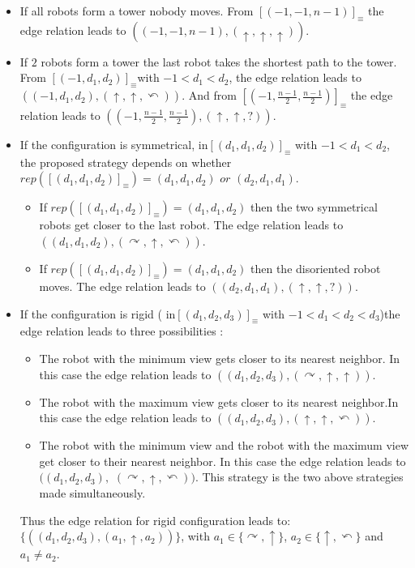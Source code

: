 \documentclass[envcountsame]{llncs} \usepackage[english]{babel}
\newcommand{\equivclass}[1]{[#1]_\equiv}
\newcommand{\rep}{\ensuremath{\mathit{rep}}}
\newcommand{\clockwise}{\ensuremath{\curvearrowright}}
\newcommand{\counterclockwise}{\ensuremath{\curvearrowleft}}
\newcommand{\still}{\ensuremath{\uparrow}}
\newcommand{\disoriented}{?}
\begin{document}
\begin{itemize}[parsep=0cm,itemsep=0cm,topsep=0cm] 
	\item If all robots form a tower nobody moves.
From $\equivclass{(-1, -1, n-1)}$ the edge relation leads to $((-1, -1, n-1),(\still, \still, \still))$.
	\item If $2$ robots form a tower the last robot takes the shortest path to the tower.
From $\equivclass{(-1, d_1, d_2)}$with $-1< d_1 < d_2$, the edge relation leads to 
$((-1, d_1, d_2),(\still, \still, \counterclockwise))$.
And from $\equivclass{(-1, \frac{n-1}{2}, \frac{n-1}{2})}$ the edge relation leads to 
$((-1,  \frac{n-1}{2}, \frac{n-1}{2}),(\still, \still, \disoriented))$.
	\item If the configuration is symmetrical, in$\equivclass{(d_1,d_1,d_2)}$ with $-1 < d_1 < d_2$, 
the proposed strategy depends on whether $\rep(\equivclass{(d_1,d_1,d_2)}) =  (d_1, d_1, d_2) \textit{ or }(d_2, d_1, d_1) $. 
	\begin{itemize}[parsep=0cm,itemsep=0cm,topsep=0cm] 	
		\item  If $\rep(\equivclass{(d_1,d_1,d_2)}) =  (d_1, d_1, d_2)$ then the two symmetrical robots get closer to the last robot.  The edge relation leads to $((d_1, d_1, d_2), (\clockwise, \still, \counterclockwise))$.
		\item  If $\rep(\equivclass{(d_1,d_1,d_2)}) =  (d_1, d_1, d_2)$ then the disoriented robot moves. The edge relation leads to $((d_2, d_1, d_1), (\still, \still, \disoriented))$.
	\end{itemize}
	\item If the configuration is rigid ( in$\equivclass{(d_1,d_2,d_3)}$ with $-1< d_1< d_2<d_3$)the edge relation leads to three possibilities : 
	\begin{itemize}[parsep=0cm,itemsep=0cm,topsep=0cm] 
		\item The robot with the minimum view gets closer to its nearest neighbor. In this case the edge relation leads to $((d_1, d_2, d_3), (\clockwise, \still, \still))$.
		\item The robot with the maximum view gets closer to its nearest neighbor.In this case the edge relation leads to $((d_1, d_2, d_3), (\still, \still, \counterclockwise))$.
		\item The robot with the minimum view and the robot with the maximum view get
		closer to their nearest neighbor.
	In this case the edge relation leads to $((d_1, d_2, d_3),$ $(\clockwise, \still, \counterclockwise))$.
		This strategy is the two above strategies made simultaneously.\end{itemize}
	Thus the edge relation for rigid configuration leads to: $\{((d_1, d_2, d_3), (a_1, \still, a_2))\}$, 
	with $a_1\in \{\clockwise, \still\}$, $a_2 \in \{\still, \counterclockwise\}$ and $a_1 \neq a_2$.
\end{itemize}
\end{document}
